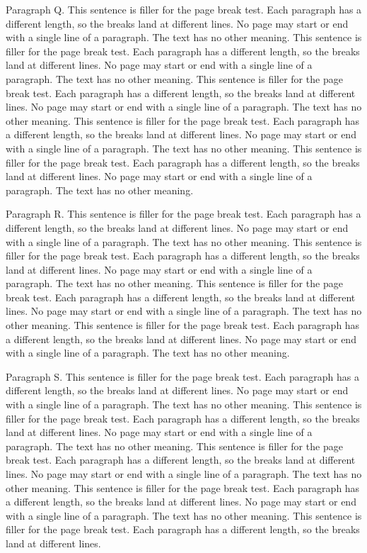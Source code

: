 Paragraph Q. This sentence is filler for the page break test. Each paragraph
has a different length, so the breaks land at different lines. No page may
start or end with a single line of a paragraph. The text has no other meaning.
This sentence is filler for the page break test. Each paragraph has a
different length, so the breaks land at different lines. No page may start or
end with a single line of a paragraph. The text has no other meaning. This
sentence is filler for the page break test. Each paragraph has a different
length, so the breaks land at different lines. No page may start or end with a
single line of a paragraph. The text has no other meaning. This sentence is
filler for the page break test. Each paragraph has a different length, so the
breaks land at different lines. No page may start or end with a single line of
a paragraph. The text has no other meaning. This sentence is filler for the
page break test. Each paragraph has a different length, so the breaks land at
different lines. No page may start or end with a single line of a paragraph.
The text has no other meaning.

Paragraph R. This sentence is filler for the page break test. Each paragraph
has a different length, so the breaks land at different lines. No page may
start or end with a single line of a paragraph. The text has no other meaning.
This sentence is filler for the page break test. Each paragraph has a
different length, so the breaks land at different lines. No page may start or
end with a single line of a paragraph. The text has no other meaning. This
sentence is filler for the page break test. Each paragraph has a different
length, so the breaks land at different lines. No page may start or end with a
single line of a paragraph. The text has no other meaning. This sentence is
filler for the page break test. Each paragraph has a different length, so the
breaks land at different lines. No page may start or end with a single line of
a paragraph. The text has no other meaning.

Paragraph S. This sentence is filler for the page break test. Each paragraph
has a different length, so the breaks land at different lines. No page may
start or end with a single line of a paragraph. The text has no other meaning.
This sentence is filler for the page break test. Each paragraph has a
different length, so the breaks land at different lines. No page may start or
end with a single line of a paragraph. The text has no other meaning. This
sentence is filler for the page break test. Each paragraph has a different
length, so the breaks land at different lines. No page may start or end with a
single line of a paragraph. The text has no other meaning. This sentence is
filler for the page break test. Each paragraph has a different length, so the
breaks land at different lines. No page may start or end with a single line of
a paragraph. The text has no other meaning. This sentence is filler for the
page break test. Each paragraph has a different length, so the breaks land at
different lines.

